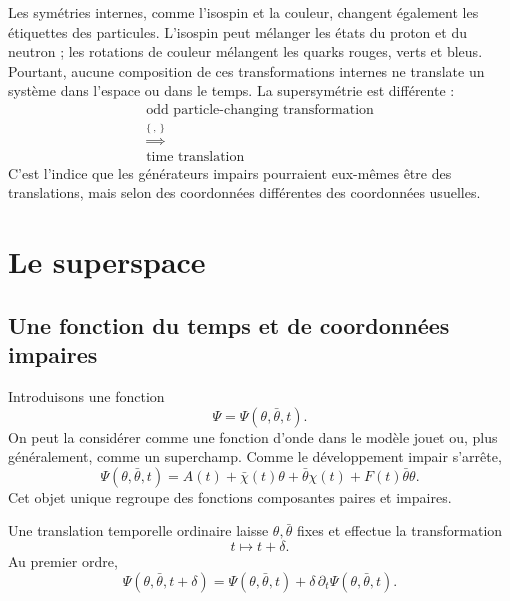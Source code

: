 Les symétries internes, comme l’isospin et la couleur, changent également les étiquettes des particules. L’isospin peut mélanger les états du proton et du neutron ; les rotations de couleur mélangent les quarks rouges, verts et bleus. Pourtant, aucune composition de ces transformations internes ne translate un système dans l’espace ou dans le temps. La supersymétrie est différente :
\begin{equation}
\begin{gathered}
\text{odd particle-changing transformation}\\
\mathrel{\stackrel{\{\ ,\ \}}{\Longrightarrow}}\\
\text{time translation}
\end{gathered}
\end{equation}
C’est l’indice que les générateurs impairs pourraient eux-mêmes être des translations, mais selon des coordonnées différentes des coordonnées usuelles.

\section{Le superspace}

\subsection{Une fonction du temps et de coordonnées impaires}

Introduisons une fonction
\begin{equation}
\Psi=\Psi(\theta,\bar\theta,t).
\end{equation}
On peut la considérer comme une fonction d’onde dans le modèle jouet ou, plus généralement, comme un superchamp. Comme le développement impair s’arrête,
\begin{equation}
\Psi(\theta,\bar\theta,t)
=A(t)+\bar\chi(t)\theta
+\bar\theta\chi(t)+F(t)\bar\theta\theta.
\end{equation}
Cet objet unique regroupe des fonctions composantes paires et impaires. 

Une translation temporelle ordinaire laisse \(\theta,\bar\theta\) fixes et effectue la transformation
\begin{equation}
t\longmapsto t+\delta.
\end{equation}
Au premier ordre,
\begin{equation}
\Psi(\theta,\bar\theta,t+\delta)
=\Psi(\theta,\bar\theta,t)
+\delta\,\partial_t\Psi(\theta,\bar\theta,t).
\end{equation}

